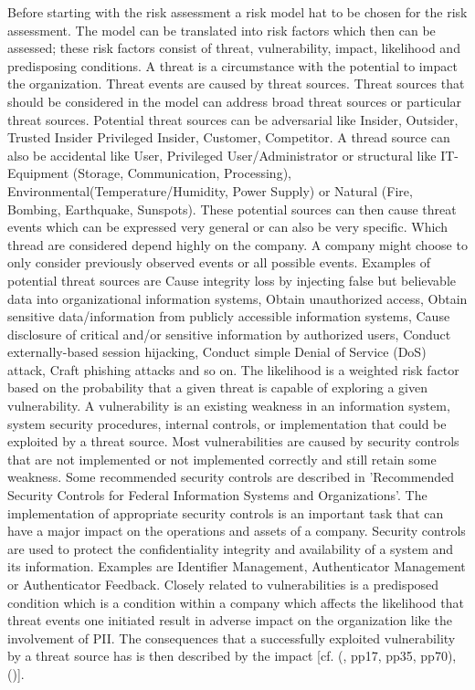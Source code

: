 Before starting with the risk assessment a risk model hat to be chosen for the risk assessment. The model can be translated into risk factors which then can be assessed; these risk factors consist of threat, vulnerability, impact, likelihood and predisposing conditions.  A threat is a circumstance with the potential to impact the organization. Threat events are caused by threat sources. Threat sources that should be considered in the model can address broad threat sources or particular threat sources. Potential threat sources can be adversarial like Insider, Outsider, Trusted Insider Privileged Insider, Customer, Competitor. A thread source can also be accidental like User, Privileged User/Administrator or structural like IT-Equipment (Storage, Communication, Processing), Environmental(Temperature/Humidity, Power Supply) or Natural (Fire, Bombing, Earthquake, Sunspots). These potential sources can then cause threat events which can be expressed very general or can also be very specific. Which thread are considered depend highly on the company. A company might choose to only consider previously observed events or all possible events. Examples of potential threat sources are Cause integrity loss by injecting false but believable data into organizational information systems, Obtain unauthorized access, Obtain sensitive data/information from publicly accessible information systems, Cause disclosure of critical and/or sensitive information by authorized users, Conduct externally-based session hijacking, Conduct simple Denial of Service (DoS) attack, Craft phishing attacks and so on. The likelihood is a weighted risk factor based on the probability that a given threat is capable of exploring a given vulnerability. A vulnerability is an existing weakness in an information system, system security procedures, internal controls, or implementation that could be exploited by a threat source. Most vulnerabilities are caused by security controls that are not implemented or not implemented correctly and still retain some weakness. Some recommended security controls are described in 'Recommended Security Controls for Federal Information Systems and Organizations'. The implementation of appropriate security controls is an important task that can have a major impact on the operations and assets of a company. Security controls are used to protect the confidentiality integrity and availability of a system and its information. Examples are Identifier Management, Authenticator Management or Authenticator Feedback. Closely related to vulnerabilities is a predisposed condition which is a condition within a company which affects the likelihood that threat events one initiated result in adverse impact on the organization like the involvement of PII. The consequences that a successfully exploited vulnerability by a threat source has is then described by the impact  [cf. (\cite{NIST:2012:GCRA}, pp17, pp35, pp70), (\cite{NIST:2017:SecurityNPrivacyControls})].

